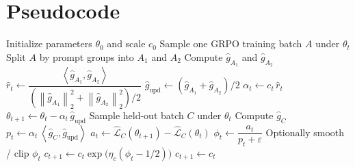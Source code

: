\documentclass[11pt,a4paper]{article}
\newcommand{\norm}[1]{\left\lVert #1 \right\rVert_2}
\newcommand{\ip}[2]{\left\langle #1,#2 \right\rangle}
\newcommand{\ghat}{\hat g}
\newcommand{\rhat}{\hat r_t}
\newcommand{\phit}{\phi_t}
\begin{document}
\section{Pseudocode}
\begin{algorithm}[h]
\caption{Adaptive learning rate for GRPO: engineering loop}
\begin{algorithmic}[1]
\State Initialize parameters $\theta_0$ and scale $c_0$
    \State Sample one GRPO training batch $A$ under $\theta_t$
    \State Split $A$ by prompt groups into $A_1$ and $A_2$
    \State Compute $\ghat_{A_1}$ and $\ghat_{A_2}$
    \State $\rhat \gets \dfrac{\ip{\ghat_{A_1}}{\ghat_{A_2}}}{(\norm{\ghat_{A_1}}^2 + \norm{\ghat_{A_2}}^2)/2}$
    \State $\ghat_{\mathrm{upd}} \gets (\ghat_{A_1}+\ghat_{A_2})/2$
    \State $\alpha_t \gets c_t\,\rhat$
    \State $\theta_{t+1} \gets \theta_t - \alpha_t\,\ghat_{\mathrm{upd}}$
        \State Sample held-out batch $C$ under $\theta_t$
        \State Compute $\ghat_C$
        \State $p_t \gets \alpha_t\,\ip{\ghat_C}{\ghat_{\mathrm{upd}}}$
        \State $a_t \gets \widehat{\mathcal L}_C(\theta_{t+1}) - \widehat{\mathcal L}_C(\theta_t)$
        \State $\phit \gets \dfrac{a_t}{p_t + \varepsilon}$
        \State Optionally smooth / clip $\phit$
        \State $c_{t+1} \gets c_t\exp\!\bigl(\eta_c(\phit - 1/2)\bigr)$
    \Else
        \State $c_{t+1} \gets c_t$
    \EndIf
\EndFor
\end{algorithmic}
\end{algorithm}
\end{document}
